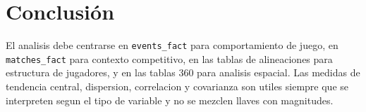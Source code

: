 \documentclass[11pt]{article}
\begin{document}
\section{Conclusión}
El analisis debe centrarse en \texttt{events\_fact} para comportamiento de juego, en \texttt{matches\_fact} para contexto competitivo, en las tablas de alineaciones para estructura de jugadores, y en las tablas 360 para analisis espacial. Las medidas de tendencia central, dispersion, correlacion y covarianza son utiles siempre que se interpreten segun el tipo de variable y no se mezclen llaves con magnitudes.
\end{document}
